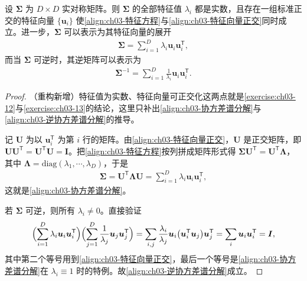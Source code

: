 \documentclass[../../main.tex]{subfiles}
\begin{document}
\begin{proposition}[实对称协方差矩阵的谱性质]\label{proposition:ch03-协方差谱分解}
设 $\boldsymbol{\Sigma}$ 为 $D\times D$ 实对称矩阵。则 $\boldsymbol{\Sigma}$ 的全部特征值 $\lambda_i$ 都是实数，且存在一组标准正交的特征向量 $\{\boldsymbol{u}_i\}$ 使\eqref{align:ch03-特征方程}与\eqref{align:ch03-特征向量正交}同时成立。进一步，$\boldsymbol{\Sigma}$ 可以表示为其特征向量的展开
\begin{align}
\boldsymbol{\Sigma}=\sum_{i=1}^{D}\lambda_{i}\boldsymbol{u}_{i}\boldsymbol{u}_{i}^{\mathsf{T}},
\label{align:ch03-协方差谱分解}
\end{align}
而当 $\boldsymbol{\Sigma}$ 可逆时，其逆矩阵可以表示为
\begin{align}
\boldsymbol{\Sigma}^{-1}=\sum_{i=1}^{D}\frac{1}{\lambda_{i}}\boldsymbol{u}_{i}\boldsymbol{u}_{i}^{\mathsf{T}}.
\label{align:ch03-逆协方差谱分解}
\end{align}
\end{proposition}
\begin{proof}
（重构新增）特征值为实数、特征向量可正交化这两点就是\cref{exercise:ch03-12}与\cref{exercise:ch03-13}的结论，这里只补出\eqref{align:ch03-协方差谱分解}与\eqref{align:ch03-逆协方差谱分解}的推导。

记 $\boldsymbol{U}$ 为以 $\boldsymbol{u}_i^{\mathsf{T}}$ 为第 $i$ 行的矩阵。由\eqref{align:ch03-特征向量正交}，$\boldsymbol{U}$ 是正交矩阵，即 $\boldsymbol{U}\boldsymbol{U}^{\mathsf{T}}=\boldsymbol{U}^{\mathsf{T}}\boldsymbol{U}=\boldsymbol{I}$。把\eqref{align:ch03-特征方程}按列拼成矩阵形式得 $\boldsymbol{\Sigma}\boldsymbol{U}^{\mathsf{T}}=\boldsymbol{U}^{\mathsf{T}}\boldsymbol{\Lambda}$，其中 $\boldsymbol{\Lambda}=\mathrm{diag}(\lambda_1,\cdots,\lambda_D)$，于是
\begin{align*}
\boldsymbol{\Sigma}=\boldsymbol{U}^{\mathsf{T}}\boldsymbol{\Lambda}\boldsymbol{U}=\sum_{i=1}^{D}\lambda_{i}\boldsymbol{u}_{i}\boldsymbol{u}_{i}^{\mathsf{T}},
\end{align*}
这就是\eqref{align:ch03-协方差谱分解}。

若 $\boldsymbol{\Sigma}$ 可逆，则所有 $\lambda_i\neq0$。直接验证
\begin{align*}
\Bigl(\sum_{i=1}^{D}\lambda_{i}\boldsymbol{u}_{i}\boldsymbol{u}_{i}^{\mathsf{T}}\Bigr)\Bigl(\sum_{j=1}^{D}\frac{1}{\lambda_{j}}\boldsymbol{u}_{j}\boldsymbol{u}_{j}^{\mathsf{T}}\Bigr)=\sum_{i,j}\frac{\lambda_i}{\lambda_j}\boldsymbol{u}_{i}\bigl(\boldsymbol{u}_{i}^{\mathsf{T}}\boldsymbol{u}_{j}\bigr)\boldsymbol{u}_{j}^{\mathsf{T}}=\sum_{i}\boldsymbol{u}_{i}\boldsymbol{u}_{i}^{\mathsf{T}}=\boldsymbol{I},
\end{align*}
其中第二个等号用到\eqref{align:ch03-特征向量正交}，最后一个等号是\eqref{align:ch03-协方差谱分解}在 $\lambda_i\equiv1$ 时的特例。故\eqref{align:ch03-逆协方差谱分解}成立。
\end{proof}
\end{document}
